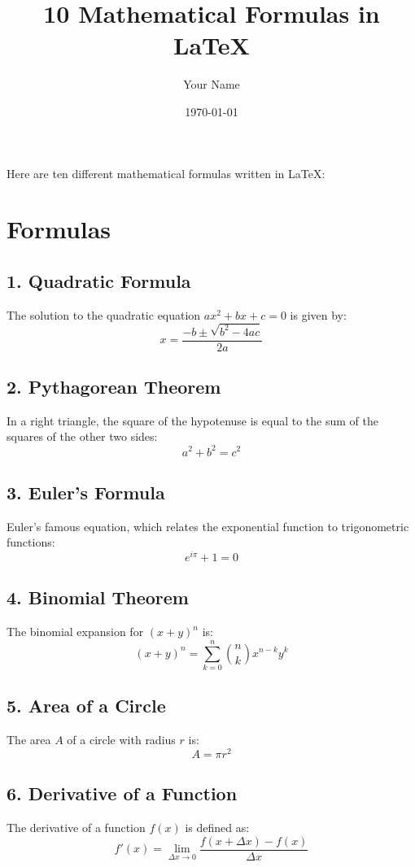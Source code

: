 \documentclass{article}
\title{10 Mathematical Formulas in LaTeX}
\author{Your Name}
\date{\today}
\begin{document}
	
	\maketitle
	
	Here are ten different mathematical formulas written in LaTeX:
	
	\section{Formulas}
	
	\subsection{1. Quadratic Formula}
	The solution to the quadratic equation \(ax^2 + bx + c = 0\) is given by:
	\[
	x = \frac{-b \pm \sqrt{b^2 - 4ac}}{2a}
	\]
	
	\subsection{2. Pythagorean Theorem}
	In a right triangle, the square of the hypotenuse is equal to the sum of the squares of the other two sides:
	\[
	a^2 + b^2 = c^2
	\]
	
	\subsection{3. Euler's Formula}
	Euler's famous equation, which relates the exponential function to trigonometric functions:
	\[
	e^{i\pi} + 1 = 0
	\]
	
	\subsection{4. Binomial Theorem}
	The binomial expansion for \((x + y)^n\) is:
	\[
	(x + y)^n = \sum_{k=0}^{n} \binom{n}{k} x^{n-k} y^k
	\]
	
	\subsection{5. Area of a Circle}
	The area \(A\) of a circle with radius \(r\) is:
	\[
	A = \pi r^2
	\]
	
	\subsection{6. Derivative of a Function}
	The derivative of a function \(f(x)\) is defined as:
	\[
	f'(x) = \lim_{\Delta x \to 0} \frac{f(x+\Delta x) - f(x)}{\Delta x}
	\]
	
\end{document}
